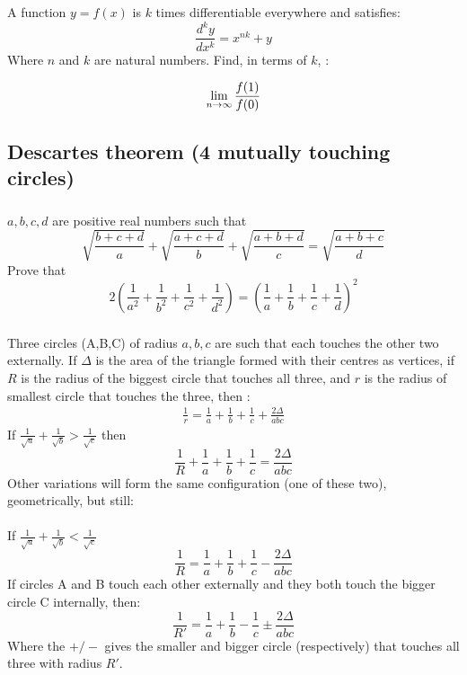 \documentclass{article}
\begin{document}
\subsection{}
A function $y= f(x)$
is $k$ times differentiable everywhere and satisfies:
$$ \frac {d^k y}{dx^k}= x^{nk} + y$$
Where $n$ and $k$ are natural numbers. Find, in terms of $k$, :

$$\lim_{n\rightarrow \infty} {{f(1)}\over {f(0)}}$$

\subsection{Descartes theorem (4 mutually touching circles)}
\subsubsection{}
$a,b,c,d$ are positive real numbers such that
$$\sqrt{\frac{b+c+d}{a}} + \sqrt{\frac{a+c+d}{b}} + \sqrt{\frac{a+b+d}{c}}  = \sqrt{\frac{a+b+c}{d}} $$
Prove that
$$2\left(\frac{1}{a^2} + \frac{1}{b^2} + \frac{1}{c^2} + \frac{1}{d^2}\right) = \left(\frac{1}{a} + \frac{1}{b} + \frac{1}{c} + \frac{1}{d}\right)^2$$

\subsubsection{}
Three circles (A,B,C) of radius $a,b,c$ are such that each touches the other two externally. If $\Delta$ is the area of the triangle formed with their centres as vertices, if $R$ is the radius of the biggest circle that touches all three, and $r$ is the radius of smallest circle that touches the three, then :
\begin{align*}
    \frac{1}{r} = \frac{1}{a} + \frac{1}{b} + \frac{1}{c} + \frac{2\Delta}{abc}
\end{align*}
If $\frac {1}{\sqrt a} + \frac {1}{\sqrt b} > \frac {1}{\sqrt c}$ then
$$\frac {1}{R} + \frac {1}{a} + \frac {1}{b} + \frac {1}{c} = \frac {2 \Delta}{abc}$$
Other variations will form the same configuration (one of these two), geometrically, but still:
\\\\
If $\frac {1}{\sqrt a} + \frac {1}{\sqrt b} < \frac {1}{\sqrt c}$ $$\frac {1}{R} = \frac {1}{a} + \frac {1}{b} + \frac {1}{c} - \frac {2 \Delta}{abc}$$
If circles A and B touch each other externally and they both touch the bigger circle C internally, then:
$$\frac {1}{R'} = \frac {1}{a} + \frac {1}{b} - \frac {1}{c} \pm  \frac {2 \Delta }{abc}$$
Where the $+/-$ gives the smaller and bigger circle (respectively) that touches all three with radius $R'$.
\end{document}
